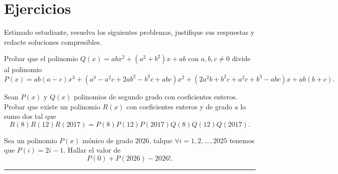 \section*{Ejercicios}

Estimado estudiante, resuelva los siguientes problemas, justifique sus respuestas y redacte soluciones compresibles.

\begin{problem-wos}
    Probar que el polinomio $Q(x) = ab x^2 + (a^2 + b^2)x + ab$ con $a,b, c \neq 0$ divide al polinomio
    \[
        P(x) = ab(a - c)x^3 + (a^3 - a^2 c + 2ab^2 - b^2 c + abc) x^2 + (2a^2 b + b^2 c + a^2 c + b^3 - abc)x + ab(b + c).
    \]
\end{problem-wos}

\begin{problem-wos}
    Sean $P(x)$ y $Q(x)$ polinomios de segundo grado con coeficientes enteros.
    Probar que existe un polinomio $R(x)$ con coeficientes enteros y de grado a lo sumo dos tal que
    \[
        R(8)R(12)R(2017) = P(8)P(12)P(2017)Q(8)Q(12)Q(2017).
    \]
\end{problem-wos}

\begin{problem-wos}
    Sea un polinomio $P(x)$ mónico de grado 2026, talque $\forall i = 1, 2, \ldots, 2025$ tenemos que $P(i) = 2i - 1$.
    Hallar el valor de
    \[
        P(0) + P(2026) - 2026!.
    \]
\end{problem-wos}

\hrule